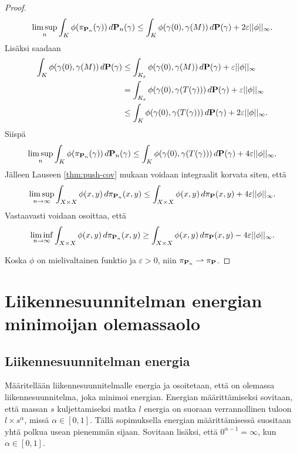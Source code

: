 \documentclass[12pt,oneside,a4paper]{amsbook} %
\begin{document}
\begin{proof}
    \begin{align*}
        \limsup_{n} \int_{K} \phi(\pi_{\P_n}(\gamma)) \, d\P_n (\gamma) \le \int_{K} \phi(\gamma(0),\gamma(M)) \, d\P (\gamma) + 2\varepsilon||\phi||_\infty.
    \end{align*}
Lisäksi saadaan
    \begin{align*}
        \int_K \phi(\gamma(0),\gamma(M)) \, d\P (\gamma) &\le \int_{K_\varepsilon} \phi(\gamma(0),\gamma(M)) \, d\P (\gamma) + \varepsilon||\phi||_\infty \\
        &=\int_{K_\varepsilon} \phi(\gamma(0),\gamma(T(\gamma))) \, d\P (\gamma) + \varepsilon||\phi||_\infty \\
        &\le \int_{K} \phi(\gamma(0),\gamma(T(\gamma))) \, d\P (\gamma) + 2\varepsilon||\phi||_\infty.
    \end{align*}
Siispä
    \begin{equation*}
        \limsup_{n} \int_{K} \phi(\pi_{\P_n}(\gamma)) \, d\P_n (\gamma) \le \int_{K} \phi(\gamma(0),\gamma(T(\gamma))) \, d\P (\gamma) + 4\varepsilon||\phi||_\infty.
    \end{equation*}
Jälleen Lauseen \ref{thm:push-cov} mukaan voidaan integraalit korvata siten, että
    \begin{equation*}
        \limsup_{n\to\infty} \int_{X \times X} \phi(x, y) \, d\pi_{\P_n} (x, y) \le \int_{X \times X} \phi(x, y) \, d\pi_{\P} (x, y) + 4\varepsilon||\phi||_\infty.
    \end{equation*}
Vastaavasti voidaan osoittaa, että 
    \begin{equation*}
        \liminf_{n\to\infty} \int_{X \times X} \phi(x, y) \, d\pi_{\P_n} (x, y) \ge \int_{X \times X} \phi(x, y) \, d\pi_{\P} (x, y) - 4\varepsilon||\phi||_\infty.
    \end{equation*}

Koska $\phi$ on mielivaltainen funktio ja $\varepsilon > 0$, niin $\pi_{\P_n} \rightharpoonup \pi_\P$.
\end{proof}

\chapter{Liikennesuunnitelman energian minimoijan olemassaolo}

\section{Liikennesuunnitelman energia}
Määritellään liikennesuunnitelmalle energia ja osoitetaan, että on olemassa liikennesuunnitelma, joka minimoi energian. Energian määrittämiseksi sovitaan, että massan $s$ kuljettamiseksi matka $l$ energia on suoraan verrannollinen tuloon $l \times s^\alpha$, missä $\alpha \in [0, 1]$. Tällä sopimuksella energian määrittämisessä suositaan yhtä polkua usean pienemmän sijaan. Sovitaan lisäksi, että $0^{\alpha - 1} = \infty$, kun $\alpha \in [0, 1]$. 
\end{document}
